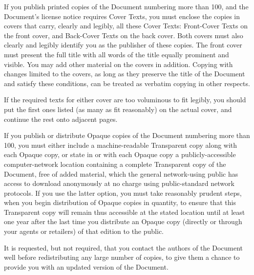     

      If you publish printed copies of the Document numbering more than 100,
      and the Document's license notice requires Cover Texts, you must enclose
      the copies in covers that carry, clearly and legibly, all these
      Cover Texts: Front-Cover Texts on the front cover, and
      Back-Cover Texts on the back cover. Both covers must also
      clearly and legibly identify you as the publisher of these
      copies. The front cover must present the full title with all
      words of the title equally prominent and visible. You may add
      other material on the covers in addition. Copying with changes
      limited to the covers, as long as they preserve the title of the
      Document and satisfy these
      conditions, can be treated as verbatim copying in other
      respects.
    

    
    

      If the required texts for either cover are too voluminous to fit
      legibly, you should put the first ones listed (as many as fit
      reasonably) on the actual cover, and continue the rest onto
      adjacent pages.
    

    
    

      If you publish or distribute Opaque copies of the Document numbering more than 100,
      you must either include a machine-readable Transparent copy along with
      each Opaque copy, or state in or with each Opaque copy a
      publicly-accessible computer-network location containing a
      complete Transparent copy of the Document, free of added
      material, which the general network-using public has access to
      download anonymously at no charge using public-standard network
      protocols. If you use the latter option, you must take
      reasonably prudent steps, when you begin distribution of Opaque
      copies in quantity, to ensure that this Transparent copy will
      remain thus accessible at the stated location until at least one
      year after the last time you distribute an Opaque copy (directly
      or through your agents or retailers) of that edition to the
      public.
    

    
    

      It is requested, but not required, that you contact the authors
      of the Document well before
      redistributing any large number of copies, to give them a chance
      to provide you with an updated version of the Document.
    

